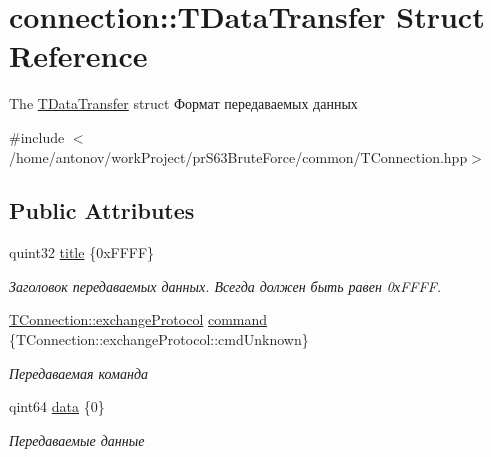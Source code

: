 \hypertarget{structconnection_1_1_t_data_transfer}{}\section{connection\+:\+:T\+Data\+Transfer Struct Reference}
\label{structconnection_1_1_t_data_transfer}


The \hyperlink{structconnection_1_1_t_data_transfer}{T\+Data\+Transfer} struct Формат передаваемых данных  




{\ttfamily \#include $<$/home/antonov/work\+Project/pr\+S63\+Brute\+Force/common/\+T\+Connection.\+hpp$>$}

\subsection*{Public Attributes}
\begin{DoxyCompactItemize}
\item 
\mbox{\label{structconnection_1_1_t_data_transfer_a66bbc3ff7818cc73b425c85cebadbe7c}} 
quint32 \hyperlink{structconnection_1_1_t_data_transfer_a66bbc3ff7818cc73b425c85cebadbe7c}{title} \{0x\+F\+F\+F\+F\}
\begin{DoxyCompactList}\small\item\em Заголовок передаваемых данных. Всегда должен быть равен 0х\+F\+F\+FF. \end{DoxyCompactList}\item 
\mbox{\label{structconnection_1_1_t_data_transfer_a8036bfcd09e3c43bb429ce639eca5d5e}} 
\hyperlink{classconnection_1_1_t_connection_a3550181cb2fa72eccfa55d23f45cea34}{T\+Connection\+::exchange\+Protocol} \hyperlink{structconnection_1_1_t_data_transfer_a8036bfcd09e3c43bb429ce639eca5d5e}{command} \{T\+Connection\+::exchange\+Protocol\+::cmd\+Unknown\}
\begin{DoxyCompactList}\small\item\em Передаваемая команда \end{DoxyCompactList}\item 
\mbox{\label{structconnection_1_1_t_data_transfer_a42d2e0b73dbedfde9dfe914f83af81ab}} 
qint64 \hyperlink{structconnection_1_1_t_data_transfer_a42d2e0b73dbedfde9dfe914f83af81ab}{data} \{0\}
\begin{DoxyCompactList}\small\item\em Передаваемые данные \end{DoxyCompactList}\end{DoxyCompactItemize}
